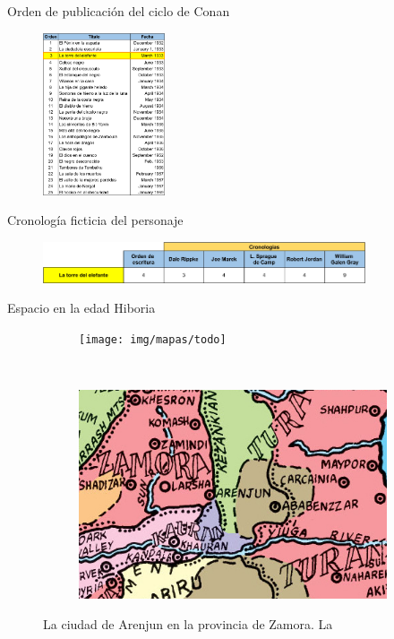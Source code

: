 \begin{frame}{Orden de publicación del ciclo de Conan}
\begin{figure}[htb]
  \centering
  \includegraphics[width=0.32\textwidth]{img/OrdenPublicacion}
\end{figure}
\end{frame}

\begin{frame}{Cronología ficticia del personaje}
\begin{figure}[htb]
  \centering
  \includegraphics[width=0.85\textwidth]{img/Cronollogias}
\end{figure}
\end{frame}

\begin{frame}{Espacio en la edad Hiboria}
\begin{figure}[htp]
 \centering
 \begin{subfigure}[b]{0.5\textwidth}
   \texttt{[image: img/mapas/todo]}
 \end{subfigure}
~
 \begin{subfigure}[b]{0.46\textwidth}
   \includegraphics[width=\textwidth]{img/mapas/inset}
 \end{subfigure}
 \caption{La ciudad de Arenjun en la provincia de Zamora. La }
 \end{figure}
\end{frame}

